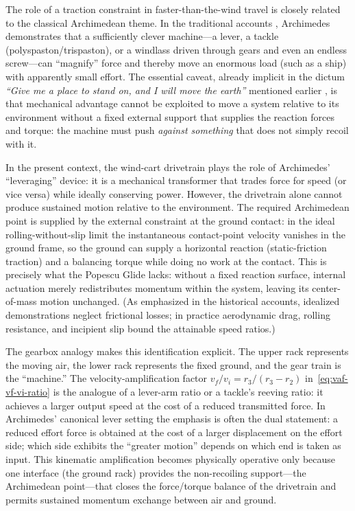 \documentclass[reprint,aps,pra,longbibliography]{revtex4-2}
\begin{document}
The role of a traction constraint in faster-than-the-wind travel is closely
related to the classical Archimedean theme. In the traditional accounts
\cite[pp.~14--17]{dijksterhuis_archimedes_2014}, Archimedes demonstrates that a
sufficiently clever machine---a lever, a tackle (polyspaston/trispaston), or a
windlass driven through gears and even an endless screw---can ``magnify''
force and thereby move an enormous load (such as a ship) with apparently small
effort. The essential caveat, already implicit in the dictum
\emph{``Give me a place to stand on, and I will move the earth''} mentioned earlier
\cite[p.~15]{dijksterhuis_archimedes_2014}, is that mechanical advantage cannot
be exploited to move a system relative to its environment without a fixed
external support that supplies the reaction forces and torque: the machine must
push \emph{against something} that does not simply recoil with it.

In the present context, the wind-cart drivetrain plays the role of Archimedes'
``leveraging'' device: it is a mechanical transformer that trades force for
speed (or vice versa) while ideally conserving power. However, the drivetrain
alone cannot produce sustained motion relative to the environment. The required
Archimedean point is supplied by the external constraint at the ground contact:
in the ideal rolling-without-slip limit the instantaneous contact-point
velocity vanishes in the ground frame, so the ground can supply a horizontal
reaction (static-friction traction) and a balancing torque while doing no work
at the contact. This is precisely what the Popescu Glide lacks: without a fixed
reaction surface, internal actuation merely redistributes momentum within the
system, leaving its center-of-mass motion unchanged. (As emphasized in the
historical accounts, idealized demonstrations neglect frictional losses; in
practice aerodynamic drag, rolling resistance, and incipient slip bound the
attainable speed ratios.)

The gearbox analogy makes this identification explicit. The upper rack
represents the moving air, the lower rack represents the fixed ground, and the
gear train is the ``machine.'' The velocity-amplification factor
$v_f/v_i = r_3/(r_3-r_2)$ in~\eqref{eq:vaf-vf-vi-ratio} is the analogue of a lever-arm ratio or a tackle's
reeving ratio: it achieves a larger output speed at the cost of a reduced
transmitted force. In Archimedes' canonical lever setting the emphasis is
often the dual statement: a reduced effort force is obtained at the cost of a
larger displacement on the effort side; which side exhibits the ``greater
motion'' depends on which end is taken as input. This kinematic amplification
becomes physically operative only because one interface (the ground rack)
provides the non-recoiling support---the Archimedean point---that closes the
force/torque balance of the drivetrain and permits sustained momentum exchange
between air and ground.
\end{document}
